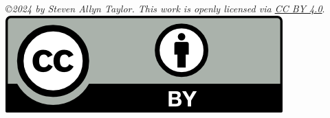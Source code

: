 \emph{\copyright 2024 by Steven Allyn Taylor. This work is openly licensed via \href{https://creativecommons.org/licenses/by/4.0/}{CC BY 4.0}}.\\
\includegraphics*[]{../Images/by.png}